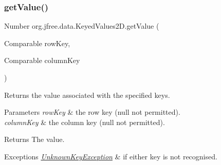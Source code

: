 \mbox{\label{interfaceorg_1_1jfree_1_1data_1_1_keyed_values2_d_a61c450ca108cd99e53174fc91393a99a}} 
\subsubsection{\texorpdfstring{get\+Value()}{getValue()}}
{\footnotesize\ttfamily Number org.\+jfree.\+data.\+Keyed\+Values2\+D.\+get\+Value (\begin{DoxyParamCaption}\item[{Comparable}]{row\+Key,  }\item[{Comparable}]{column\+Key }\end{DoxyParamCaption})}

Returns the value associated with the specified keys.


\begin{DoxyParams}{Parameters}
{\em row\+Key} & the row key ({\ttfamily null} not permitted). \\
\hline
{\em column\+Key} & the column key ({\ttfamily null} not permitted).\\
\hline
\end{DoxyParams}
\begin{DoxyReturn}{Returns}
The value.
\end{DoxyReturn}

\begin{DoxyExceptions}{Exceptions}
{\em \mbox{\hyperlink{classorg_1_1jfree_1_1data_1_1_unknown_key_exception}{Unknown\+Key\+Exception}}} & if either key is not recognised. \\
\hline
\end{DoxyExceptions}


